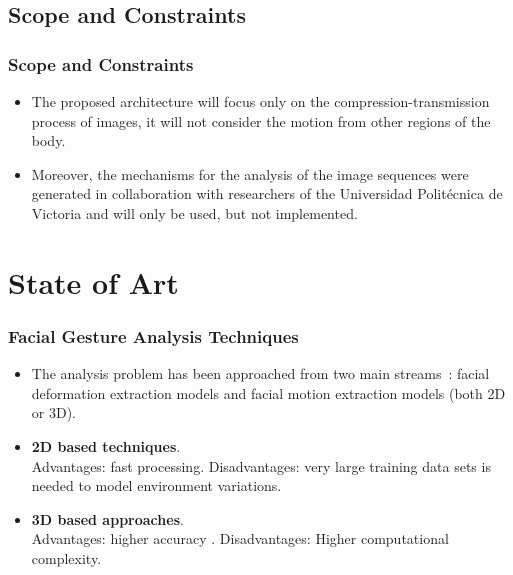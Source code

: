 \documentclass[compress]{beamer}
\begin{document}
\subsection{Scope and Constraints}
\begin{frame}
	\frametitle{Scope and Constraints}
	\begin{itemize}
	\item The proposed architecture will focus only on the compression-transmission process of images, it will not consider the motion from other regions of the body.
	\item Moreover, the mechanisms for the analysis of the image sequences were generated in collaboration with researchers of the Universidad Polit\'ecnica de Victoria and will only be used, but not implemented.
	\end{itemize}
\end{frame}

\section{State of Art}
\begin{frame}
	\frametitle{Facial Gesture Analysis Techniques}
	\begin{itemize}
	\item The analysis problem has been approached from two main streams~\cite{Fasel2003}: facial deformation extraction models and facial motion extraction models (both 2D or 3D).
	\item \textbf{2D based techniques}.\\Advantages: fast processing. Disadvantages: very large training data sets is needed to model environment variations.
	\item \textbf{3D based approaches}.\\Advantages: higher accuracy \cite{Fang2012}. Disadvantages: Higher computational complexity.
	\end{itemize}
\end{frame}
\end{document}
